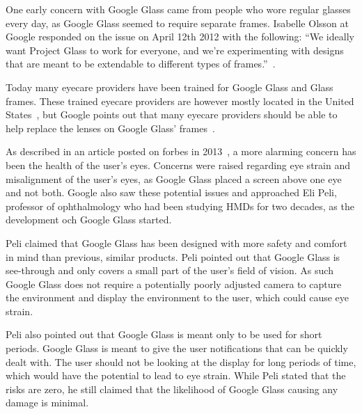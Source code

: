 One early concern with Google Glass came from people who wore regular glasses every day, as Google Glass seemed to require separate frames. Isabelle Olsson at Google responded on the issue on April 12th 2012 with the following: ``We ideally want Project Glass to work for everyone, and we're experimenting with designs that are meant to be extendable to different types of frames.''~\cite{GoogleGlassFrameResponse}.

Today many eyecare providers have been trained for Google Glass and Glass frames. These trained eyecare providers are however mostly located in the United States~\cite{frameProviders}, but Google points out that many eyecare providers should be able to help replace the lenses on Google Glass' frames~\cite{framesGlass}.

As described in an article posted on forbes in 2013~\cite{ackerman13}, a more alarming concern has been the health of the user's eyes. Concerns were raised regarding eye strain and misalignment of the user's eyes, as Google Glass placed a screen above one eye and not both. Google also saw these potential issues and approached Eli Peli, professor of ophthalmology who had been studying HMDs for two decades, as the development och Google Glass started.

Peli claimed that Google Glass has been designed with more safety and comfort in mind than previous, similar products. Peli pointed out that Google Glass is see-through and only covers a small part of the user's field of vision. As such Google Glass does not require a potentially poorly adjusted camera to capture the environment and display the environment to the user, which could cause eye strain.

Peli also pointed out that Google Glass is meant only to be used for short periods. Google Glass is meant to give the user notifications that can be quickly dealt with. The user should not be looking at the display for long periods of time, which would have the potential to lead to eye strain. While Peli stated that the risks are zero, he still claimed that the likelihood of Google Glass causing any damage is minimal.

